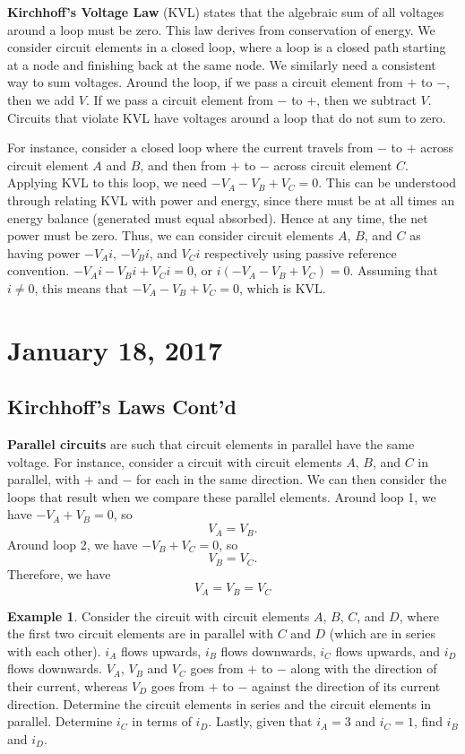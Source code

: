 \documentclass[11pt]{article}
\theoremstyle{plain} %
\theoremstyle{definition}
\theoremstyle{example}
\newtheorem*{example}{Example}
\theoremstyle{remark}
\begin{document}
\textbf{Kirchhoff's Voltage Law} (KVL) states that the algebraic sum of all voltages around a loop must be zero. This law derives from conservation of energy. We consider circuit elements in a closed loop, where a loop is a closed path starting at a node and finishing back at the same node. We similarly need a consistent way to sum voltages. Around the loop, if we pass a circuit element from $+$ to $-$, then we add $V$. If we pass a circuit element from $-$ to $+$, then we subtract $V$. Circuits that violate KVL have voltages around a loop that do not sum to zero. 

For instance, consider a closed loop where the current travels from $-$ to $+$ across circuit element $A$ and $B$, and then from $+$ to $-$ across circuit element $C$. Applying KVL to this loop, we need $-V_A-V_B+V_C=0$. This can be understood through relating KVL with power and energy, since there must be at all times an energy balance (generated must equal absorbed). Hence at any time, the net power must be zero. Thus, we can consider circuit elements $A$, $B$, and $C$ as having power $-V_Ai$, $-V_Bi$, and $V_Ci$ respectively using passive reference convention. $-V_Ai-V_Bi+V_Ci=0$, or $i(-V_A-V_B+V_C) = 0$. Assuming that $i \neq 0$, this means that $-V_A-V_B+V_C=0$, which is KVL.

\section{January 18, 2017}
\subsection{Kirchhoff's Laws Cont'd}

\textbf{Parallel circuits} are such that circuit elements in parallel have the same voltage. For instance, consider a circuit with circuit elements $A$, $B$, and $C$ in parallel, with $+$ and $-$ for each in the same direction. We can then consider the loops that result when we compare these parallel elements. Around loop 1, we have $-V_A + V_B = 0$, so 
$$V_A = V_B.$$
Around loop 2, we have $-V_B+V_C = 0$, so 
$$V_B =V_C.$$
Therefore, we have
$$V_A = V_B = V_C$$

\begin{example}
Consider the circuit with circuit elements $A$, $B$, $C$, and $D$, where the first two circuit elements are in parallel with $C$ and $D$ (which are in series with each other). $i_A$ flows upwards, $i_B$ flows downwards, $i_C$ flows upwards, and $i_D$ flows downwards. $V_A$, $V_B$ and $V_C$ goes from $+$ to $-$ along with the direction of their current, whereas $V_D$ goes from $+$ to $-$ against the direction of its current direction. Determine the circuit elements in series and the circuit elements in parallel. Determine $i_C$ in terms of $i_D$. Lastly, given that $i_A = 3$ and $i_C = 1$, find $i_B$ and $i_D$. 
\end{example}
\end{document}
